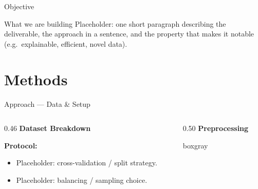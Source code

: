 \begin{frame}{Objective}
  \begin{block}{What we are building}
    Placeholder: one short paragraph describing the deliverable, the
    approach in a sentence, and the property that makes it notable
    (e.g.\ explainable, efficient, novel data).
  \end{block}
\end{frame}

\section{Methods}

\begin{frame}{Approach --- Data \& Setup}
  \begin{columns}[T]
    \begin{column}{0.46\textwidth}\centering
      {\small\Raleway\bfseries\color{aggieblue} Dataset Breakdown}\\[1.0em]
      \renewcommand{\arraystretch}{1.5}
      \vspace{0.6em}
      \begin{flushleft}\color{coolgray}
        \textbf{Protocol:}
        \begin{itemize}
          \item Placeholder: cross-validation / split strategy.
          \item Placeholder: balancing / sampling choice.
        \end{itemize}
      \end{flushleft}
    \end{column}
    \begin{column}{0.50\textwidth}\centering
      {\small\Raleway\bfseries\color{aggieblue} Preprocessing}\\[1.0em]
      \begin{beamercolorbox}[wd=\textwidth,rounded=true,sep=0.3em]{boxgray}
        \centering{}
      \end{beamercolorbox}
    \end{column}
  \end{columns}
\end{frame}

